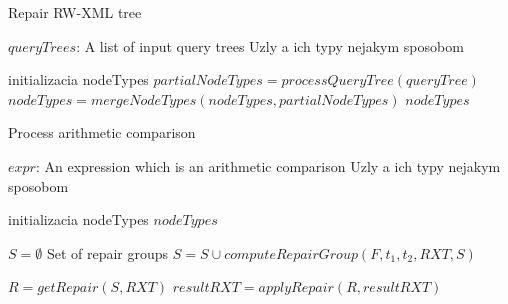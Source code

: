 \begin{algorithm}
\caption{Repair RW-XML tree}
\label{propAlgo}
\begin{algorithmic}[1]
\REQUIRE $queryTrees$: A list of input query trees
\ENSURE Uzly a ich typy nejakym sposobom

\STATE initializacia nodeTypes
    \STATE $partialNodeTypes = processQueryTree(queryTree)$
    \STATE $nodeTypes = mergeNodeTypes(nodeTypes, partialNodeTypes)$
\ENDFOR
\RETURN $nodeTypes$
\end{algorithmic}
\end{algorithm}

\begin{algorithm}
\caption{Process arithmetic comparison}
\label{algorithm_process_arithmetic comparison}
\begin{algorithmic}[1]
\REQUIRE $expr$: An expression which is an arithmetic comparison
\ENSURE Uzly a ich typy nejakym sposobom

\STATE initializacia nodeTypes
\RETURN $nodeTypes$


    \STATE $S = \emptyset$ \COMMENT Set of repair groups
		    \STATE $S = S \cup computeRepairGroup(F, t_1, t_2, RXT, S)$
	    \ENDFOR
    \ENDFOR

    \STATE $R = getRepair(S, RXT)$
    \STATE $resultRXT = applyRepair(R, resultRXT)$
\ENDWHILE
\end{algorithmic}
\end{algorithm}
